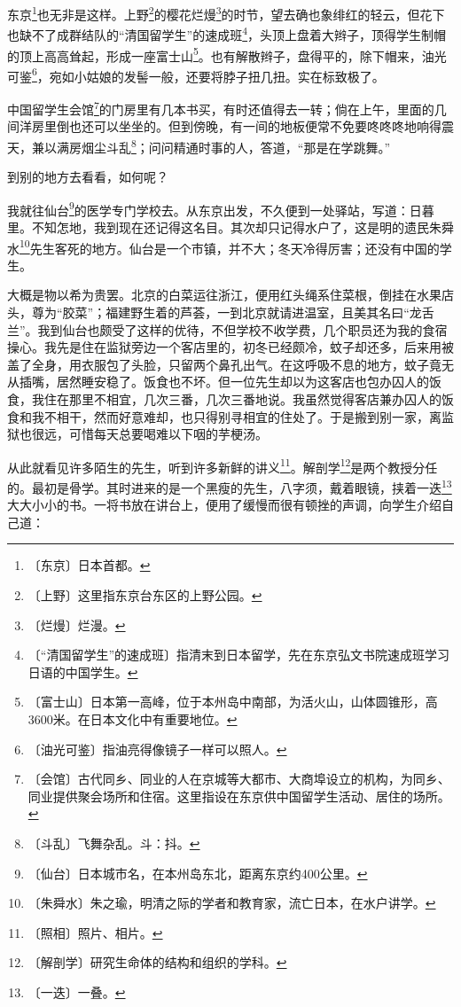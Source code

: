 \documentclass[12pt,UTF-8,openany]{ctexbook}
\begin{document}
\begin{normalsize}
    
    东京\footnote{〔东京〕日本首都。}也无非是这样。上野\footnote{〔上野〕这里指东京台东区的上野公园。}的樱花烂熳\footnote{〔烂熳〕烂漫。}的时节，望去确也象绯红的轻云，但花下也缺不了成群结队的“清国留学生”的速成班\footnote{〔“清国留学生”的速成班〕指清末到日本留学，先在东京弘文书院速成班学习日语的中国学生。}，头顶上盘着大辫子，顶得学生制帽的顶上高高耸起，形成一座富士山\footnote{〔富士山〕日本第一高峰，位于本州岛中南部，为活火山，山体圆锥形，高3600米。在日本文化中有重要地位。}。也有解散辫子，盘得平的，除下帽来，油光可鉴\footnote{〔油光可鉴〕指油亮得像镜子一样可以照人。}，宛如小姑娘的发髻一般，还要将脖子扭几扭。实在标致极了。
    
    中国留学生会馆\footnote{〔会馆〕古代同乡、同业的人在京城等大都市、大商埠设立的机构，为同乡、同业提供聚会场所和住宿。这里指设在东京供中国留学生活动、居住的场所。}的门房里有几本书买，有时还值得去一转；倘在上午，里面的几间洋房里倒也还可以坐坐的。但到傍晚，有一间的地板便常不免要咚咚咚地响得震天，兼以满房烟尘斗乱\footnote{〔斗乱〕飞舞杂乱。斗：抖。}；问问精通时事的人，答道，“那是在学跳舞。”
    
    到别的地方去看看，如何呢？
    
    我就往仙台\footnote{〔仙台〕日本城市名，在本州岛东北，距离东京约400公里。}的医学专门学校去。从东京出发，不久便到一处驿站，写道：日暮里。不知怎地，我到现在还记得这名目。其次却只记得水户了，这是明的遗民朱舜水\footnote{〔朱舜水〕朱之瑜，明清之际的学者和教育家，流亡日本，在水户讲学。}先生客死的地方。仙台是一个市镇，并不大；冬天冷得厉害；还没有中国的学生。
    
    大概是物以希为贵罢。北京的白菜运往浙江，便用红头绳系住菜根，倒挂在水果店头，尊为“胶菜”；福建野生着的芦荟，一到北京就请进温室，且美其名曰“龙舌兰”。我到仙台也颇受了这样的优待，不但学校不收学费，几个职员还为我的食宿操心。我先是住在监狱旁边一个客店里的，初冬已经颇冷，蚊子却还多，后来用被盖了全身，用衣服包了头脸，只留两个鼻孔出气。在这呼吸不息的地方，蚊子竟无从插嘴，居然睡安稳了。饭食也不坏。但一位先生却以为这客店也包办囚人的饭食，我住在那里不相宜，几次三番，几次三番地说。我虽然觉得客店兼办囚人的饭食和我不相干，然而好意难却，也只得别寻相宜的住处了。于是搬到别一家，离监狱也很远，可惜每天总要喝难以下咽的芋梗汤。
    
    从此就看见许多陌生的先生，听到许多新鲜的讲义\footnote{〔照相〕照片、相片。}。解剖学\footnote{〔解剖学〕研究生命体的结构和组织的学科。}是两个教授分任的。最初是骨学。其时进来的是一个黑瘦的先生，八字须，戴着眼镜，挟着一迭\footnote{〔一迭〕一叠。}大大小小的书。一将书放在讲台上，便用了缓慢而很有顿挫的声调，向学生介绍自己道：
    

\end{normalsize}
\end{document}
